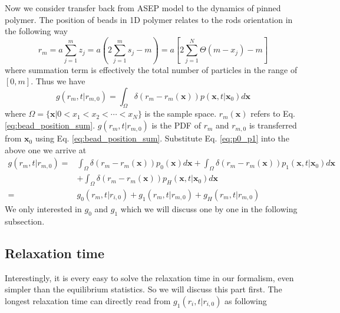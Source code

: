 \documentclass[12pt,a4paper]{article}
\begin{document}
Now we consider transfer back from ASEP model to the dynamics of pinned polymer.
The position of beads in 1D polymer relates to the rods orientation in the
following way
\begin{equation}
    \label{eq:bead_position_sum}
    r_m = a\sum_{j=1}^m z_j = a(2\sum_{j=1}^m s_j - m) =
    a\left[2\sum_{j=1}^N\Theta(m - x_j)-m\right]
\end{equation}
where summation term is effectively the total number of particles in the range
of $[0, m]$. Thus we have 
\begin{equation}
    \label{eq:bead_position_integral}
    g(r_m, t|r_{m,0}) = \int_{\Omega} \delta(r_m -
    r_m(\mathbf{x}))p(\mathbf{x}, t | \mathbf{x}_0)d\mathbf{x}
\end{equation}
where $\Omega = \{\mathbf{x} | 0 < x_1 < x_2 < \cdots < x_N\}$ is the sample
space.  $r_m(\mathbf{x})$ refers to Eq.  \eqref{eq:bead_position_sum}. $g(r_m,
t|r_{m,0})$ is the PDF of $r_m$ and $r_{m,0}$ is transferred from $\mathbf{x}_0$
using Eq.  \eqref{eq:bead_position_sum}. Substitute Eq.  \eqref{eq:p0_p1} into
the above one we arrive at
\begin{equation}
\begin{aligned}
    \label{eq:bead_position_substitution}
    g(r_m,t|r_{m,0}) = & \int_{\Omega} \delta(r_m - r_m(\mathbf{x}))
    p_0(\mathbf{x}) d\mathbf{x}+ \int_{\Omega} \delta(r_m -
    r_m(\mathbf{x}))p_1(\mathbf{x}, t | \mathbf{x}_0) d\mathbf{x}\\
    & + \int_{\Omega}\delta(r_m - r_m(\mathbf{x}))p_H(\mathbf{x}, t| \mathbf{x}_0) d\mathbf{x} \\
    = & g_0(r_m,t|r_{i,0}) + g_1(r_m,t|r_{m,0}) + g_H(r_m,t|r_{m,0})
    \end{aligned}
\end{equation}
We only interested in $g_0$ and $g_1$ which we will discuss one by one in the
following subsection.

\subsection{Relaxation time}
\label{sub:relaxation_time}
Interestingly, it is every easy to solve the relaxation time in our formalism,
even simpler than the equilibrium statistics. So we will discuss this part
first. The longest relaxation time can directly read from $g_1(r_i,t|r_{i,0})$ as
following
\end{document}
